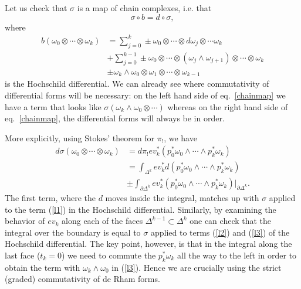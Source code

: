 \documentclass{amsart}
\begin{document}
Let us check that $\sigma$ is a map of chain complexes, i.e. that
\begin{equation}
    \sigma \circ b = d \circ \sigma,
    \label{chainmap}
\end{equation}
where
\begin{align}
    b(\omega_0\otimes \cdots \otimes \omega_k) &=
    \sum_{j=0}^k \pm \omega_0\otimes\cdots \otimes
    d\omega_j \otimes \cdots \omega_k \label{l1}\\
    &+ \sum_{j=0}^{k-1} \pm \omega_0\otimes \cdots\otimes
    (\omega_j\wedge\omega_{j+1}) \otimes \cdots \otimes \omega_k \label{l2} \\
    & \pm \omega_k\wedge\omega_0\otimes\omega_1\otimes \cdots\otimes 
    \omega_{k-1}\label{l3}
\end{align}
is the Hochschild differential. We can already see where commutativity of 
differential forms will be necessary: on the left hand side of 
eq.~\ref{chainmap} we have a term that looks like
$\sigma(\omega_k\wedge\omega_0\otimes \cdots)$ whereas on the right hand side of 
eq.~\ref{chainmap}, the 
differential forms will always be in order. 

More explicitly, using Stokes' theorem for $\pi_!$, we have
\begin{align*}
    d\sigma(\omega_0\otimes\cdots\otimes\omega_k) &= 
    d\pi_!ev_k^*(p_0^*\omega_0\wedge\cdots\wedge p_k^*\omega_k) \\
    &= \int_{\Delta^k}ev_k^*d(p_0^*\omega_0\wedge\cdots\wedge p_k^*\omega_k) \\
    &\pm\int_{\partial\Delta^k} ev_k^*(p_0^*\omega_0\wedge\cdots\wedge 
    p_k^*\omega_k)|_{\partial\Delta^k}.
\end{align*}
The first term, where the $d$ moves inside the integral, matches up with 
$\sigma$ applied to the term (\ref{l1}) in the Hochschild differential.
Similarly, by examining the behavior of $ev_k$ along each of the faces 
$\Delta^{k-1}\subset\Delta^k$ one can check that the integral over the boundary 
is equal to $\sigma$ applied to terms (\ref{l2}) and (\ref{l3}) of the 
Hochschild differential. The key point, however, is that in the integral along 
the last face ($t_k=0$) we need to commute the $p_k^*\omega_k$ all the way to
the left in order to obtain the term with $\omega_k\wedge\omega_0$ in 
(\ref{l3}). Hence we are crucially using the
strict (graded) commutativity of de Rham forms.
\end{document}
